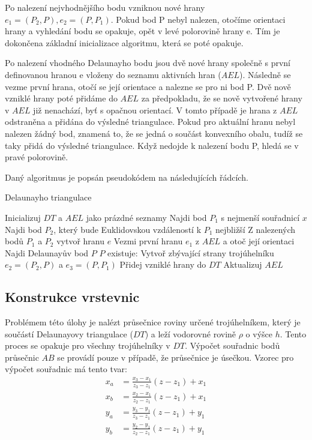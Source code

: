 \documentclass[a4paper,12pt]{article}
\begin{document}
    Po nalezení nejvhodnějšího bodu vzniknou nové hrany $e_1 = (P_2, P), e_2 = (P, P_1)$. Pokud bod P nebyl nalezen, otočíme orientaci hrany a vyhledání bodu se opakuje, opět v levé polorovině hrany e. Tím je dokončena základní inicializace algoritmu, která se poté opakuje.

    Po nalezení vhodného Delaunayho bodu jsou dvě nové hrany společně s první definovanou hranou e vloženy do seznamu aktivních hran ($AEL$). Následně se vezme první hrana, otočí se její orientace a nalezne se pro ni bod P. Dvě nově vzniklé hrany poté přidáme do $AEL$ za předpokladu, že se nově vytvořené hrany v $AEL$ již nenachází, byť s opačnou orientací. V tomto případě je hrana z $AEL$ odstraněna a přidána do výsledné triangulace. Pokud pro aktuální hranu nebyl nalezen žádný bod, znamená to, že se jedná o součást konvexního obalu, tudíž se taky přidá do výsledné triangulace. Když nedojde k nalezení bodu P, hledá se v pravé polorovině.

    Daný algoritmus je popsán pseudokódem na následujících řádcích.

    \begin{algorithm}[H]
    \caption{Delaunayho triangulace}
        \begin{algorithmic}[1]
        \State Inicializuj $DT$ a $AEL$ jako prázdné seznamy
        \State Najdi bod $P_1$ s nejmenší souřadnicí $x$
        \State Najdi bod $P_2$, který bude Euklidovskou vzdáleností k $P_1$ nejbližší
        \State Z nalezených bodů $P_1$ a $P_2$ vytvoř hranu $e$
        \State \indent Vezmi první hranu $e_1$ z $AEL$ a otoč její orientaci
        \State \indent Najdi Delaunayův bod $P$
        \State {} {$P$ existuje:}
        \State \indent \indent Vytvoř zbývající strany trojúhelníku $e_2 = (P_2,P)$ a $e_3 = (P,P_1)$
        \State \indent \indent Přidej vzniklé hrany do $DT$
        \State \indent \indent Aktualizuj $AEL$
        \end{algorithmic}
    \end{algorithm}

    \subsection{Konstrukce vrstevnic}
    Problémem této úlohy je nalézt průsečnice roviny určené trojúhelníkem, který je součástí Delaunayovy triangulace ($DT$) a leží vodorovné rovině $\rho$ o výšce $h$. Tento proces se opakuje pro všechny trojúhelníky v $DT$. Výpočet souřadnic bodů průsečnic $AB$ se provádí pouze v případě, že průsečnice je úsečkou. Vzorec pro výpočet souřadnic má tento tvar:
    \begin{align*}
    x_{a} &= \frac{x_{3} - x_{1}}{z_{3} - z_{1}}(z - z_{1}) + x_{1} \\
    x_{b} &= \frac{x_{2} - x_{1}}{z_{2} - z_{1}}(z - z_{1}) + x_{1} \\
    y_{a} &= \frac{y_{3} - y_{1}}{z_{3} - z_{1}}(z - z_{1}) + y_{1} \\
    y_{b} &= \frac{y_{2} - y_{1}}{z_{2} - z_{1}}(z - z_{1}) + y_{1}
    \end{align*}
\end{document}
